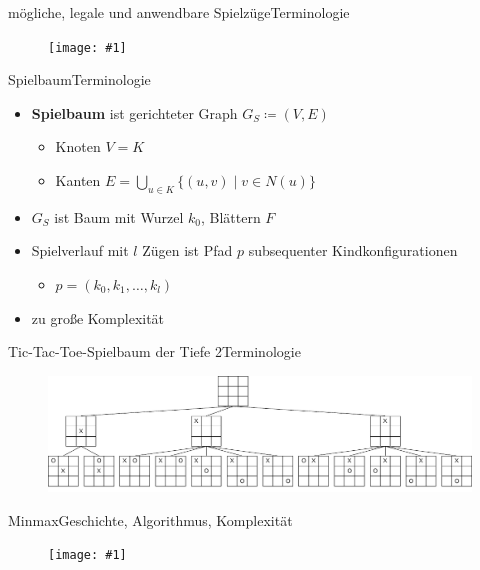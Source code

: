 \documentclass[18pt, aspectratio=169]{beamer}
\newcommand\g[3]{%
  \begin{figure}[!ht]
  \centering
  \texttt{[image: \#1]}
  {\small#3}
  \end{figure}}
\newcommand\gw[2]{%
  \begin{figure}[!ht]
  \centering
  \texttt{[image: \#1]}
  {\small#2}
  \end{figure}}
\begin{document}
\begin{frame}{mögliche, legale und anwendbare Spielzüge}{Terminologie}
	\g{img/spielzuege.pdf}{1}{}
\end{frame}

\begin{frame}{Spielbaum}{Terminologie}
	\begin{itemize}
		\item \textbf{Spielbaum} ist gerichteter Graph $G_S \coloneqq (V,E)$ 
		\pause
		\begin{itemize}
			\item Knoten $V = K$
			\pause
			\item Kanten $E = \bigcup\limits_{u \in K}\{(u,v) \mid v \in N(u)\}$
		\end{itemize}

		\pause
		\item $G_S$ ist Baum mit Wurzel $k_0$, Blättern $F$
		\pause
		\item Spielverlauf mit $l$ Zügen ist Pfad $p$ subsequenter Kindkonfigurationen
		\begin{itemize}
			\item $p = (k_0,k_1,\dots,k_l)$
		\end{itemize}
		\item zu große Komplexität
	\end{itemize}
\end{frame}

\begin{frame}{Tic-Tac-Toe-Spielbaum der Tiefe 2}{Terminologie}
	\begin{figure}[!ht]
  \centering
  \includegraphics[width=\textwidth]{tic.pdf}
  \end{figure}
\end{frame}



\begin{frame}{Minmax}{Geschichte, Algorithmus, Komplexität}
  \gw{a/agenda_diagram_MinMax.pdf}{}
\end{frame}
\end{document}
